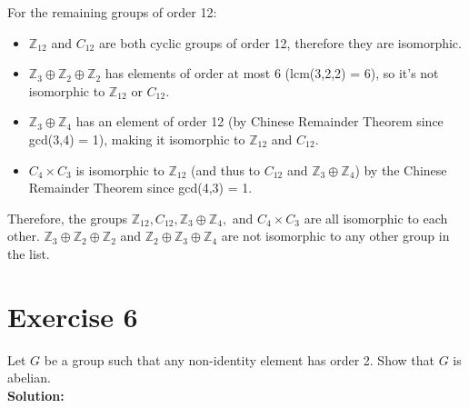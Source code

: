 \documentclass{article}
\begin{document}
For the remaining groups of order 12:
   \begin{itemize}
   \item $\mathbb{Z}_{12}$ and $C_{12}$ are both cyclic groups of order 12, therefore they are isomorphic.
   
   \item $\mathbb{Z}_3 \oplus \mathbb{Z}_2 \oplus \mathbb{Z}_2$ has elements of order at most 6 (lcm(3,2,2) = 6), so it's not isomorphic to $\mathbb{Z}_{12}$ or $C_{12}$.
   
   \item $\mathbb{Z}_3 \oplus \mathbb{Z}_4$ has an element of order 12 (by Chinese Remainder Theorem since gcd(3,4) = 1), making it isomorphic to $\mathbb{Z}_{12}$ and $C_{12}$.
   
   \item $C_4 \times C_3$ is isomorphic to $\mathbb{Z}_{12}$ (and thus to $C_{12}$ and $\mathbb{Z}_3 \oplus \mathbb{Z}_4$) by the Chinese Remainder Theorem since gcd(4,3) = 1.
   \end{itemize}

Therefore, the groups $\mathbb{Z}_{12}, C_{12}, \mathbb{Z}_3 \oplus \mathbb{Z}_4,$ and $C_4 \times C_3$ are all isomorphic to each other.
$\mathbb{Z}_3 \oplus \mathbb{Z}_2 \oplus \mathbb{Z}_2$ and $\mathbb{Z}_2 \oplus \mathbb{Z}_3 \oplus \mathbb{Z}_4$ are not isomorphic to any other group in the list.

\newpage

\section*{Exercise 6}
Let $G$ be a group such that any non-identity element has order 2. Show that $G$ is abelian. \\

\textbf{Solution:} \\
\end{document}
